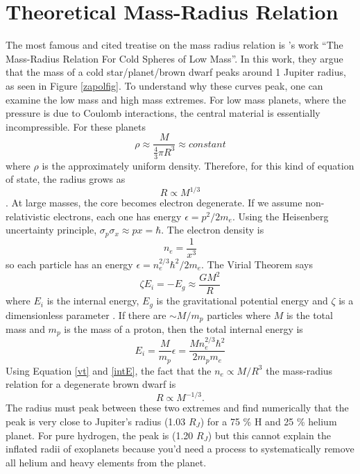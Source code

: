 \documentclass[twocolumn]{emulateapj}
\begin{document}
\section{Theoretical Mass-Radius Relation}
The most famous and cited treatise on the mass radius relation is \citet{zapolsky}'s work ``The Mass-Radius Relation For Cold Spheres of Low Mass''. In this work, they argue that the mass of a cold star/planet/brown dwarf peaks around 1 Jupiter radius, as seen in Figure \ref{zapolfig}. To understand why these curves peak, one can examine the low mass and high mass extremes. For low mass planets, where the pressure is due to Coulomb interactions, the central material is essentially incompressible. For these planets
\begin{equation}
\rho \approx \frac{M}{\frac{4}{3} \pi R^3} \approx constant
\end{equation}
where $\rho$ is the approximately uniform density.
Therefore, for this kind of equation of state, the radius grows as
\begin{equation}
R \propto M^{1/3}
\end{equation}
. At large masses, the core becomes electron degenerate. If we assume non-relativistic electrons, each one has energy $\epsilon = p^2/2 m_e$. Using the Heisenberg uncertainty principle, $\sigma_p \sigma_x \approx p x = \hbar$. The electron density is
\begin{equation}
n_e = \frac{1}{x^3}
\end{equation}
so each particle has an energy $\epsilon = n_e^{2/3} \hbar^2 / 2m_e$. The Virial Theorem says
\begin{equation}\label{vt}
\zeta E_i = - E_g \approx \frac{G M^2}{R}
\end{equation}
where $E_i$ is the internal energy, $E_g$ is the gravitational potential energy and $\zeta$ is a dimensionless parameter \citep{kippenhahn}. If there are $\sim M/m_p$ particles where $M$ is the total mass and $m_p$ is the mass of a proton, then the total internal energy is
\begin{equation} \label{intE}
E_i = \frac{M}{m_p} \epsilon = \frac{M n_e^{2/3} \hbar^2}{2 m_p m_e}
\end{equation}
Using Equation \ref{vt} and \ref{intE}, the fact that the $n_e \propto M/R^3$ the mass-radius relation for a degenerate brown dwarf is 
\begin{equation}\label{degenMR}
R \propto M^{-1/3}.
\end{equation}
The radius must peak between these two extremes and \citep{zapolsky} find numerically that the peak is very close to Jupiter's radius (1.03 $R_J$) for a 75 \% H and 25 \% helium planet. For pure hydrogen, the peak is (1.20 $R_J$) but this cannot explain the inflated radii of exoplanets because you'd need a process to systematically remove all helium and heavy elements from the planet.
\end{document}
